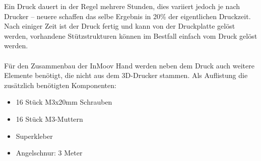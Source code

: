 \documentclass[titlepage,12pt,twoside]{article}
\begin{document}
Ein Druck dauert in der Regel mehrere Stunden, dies variiert jedoch je nach Drucker – neuere schaffen das selbe Ergebnis in 20\% der eigentlichen Druckzeit. \\
Nach einiger Zeit ist der Druck fertig und kann von der Druckplatte gelöst werden, vorhandene Stützstrukturen können im Bestfall einfach vom Druck gelöst werden. \\
\\
Für den Zusammenbau der InMoov Hand werden neben dem Druck auch weitere Elemente benötigt, die nicht aus dem 3D-Drucker stammen. 
Als Auflistung die zusätzlich benötigten Komponenten:
\begin{itemize}
	\item 16 Stück M3x20mm Schrauben
	\item 16 Stück M3-Muttern
	\item Superkleber
	\item Angelschnur: 3 Meter
\end{itemize}
\end{document}

